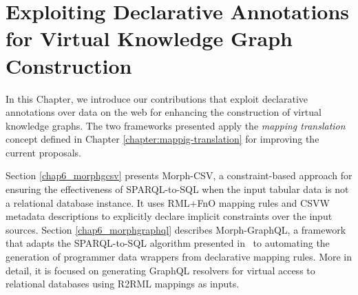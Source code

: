 
\chapter{Exploiting Declarative Annotations for Virtual Knowledge Graph Construction}
\label{chapter:virtual}

In this Chapter, we introduce our contributions that exploit declarative annotations over data on the web for enhancing the construction of virtual knowledge graphs. The two frameworks presented apply the \textit{mapping translation} concept defined in Chapter \ref{chapter:mappig-translation} for improving the current proposals. 

Section \ref{chap6_morphgcsv} presents Morph-CSV, a constraint-based approach for ensuring the effectiveness of SPARQL-to-SQL when the input tabular data is not a relational database instance. It uses RML+FnO mapping rules and CSVW metadata descriptions to explicitly declare implicit constraints over the input sources. Section \ref{chap6_morphgraphql} describes Morph-GraphQL, a framework that adapts the SPARQL-to-SQL algorithm presented in~\citep{chebotko2009semantics} to automating the generation of programmer data wrappers from declarative mapping rules. More in detail, it is focused on generating GraphQL resolvers for virtual access to relational databases using R2RML mappings as inputs.



